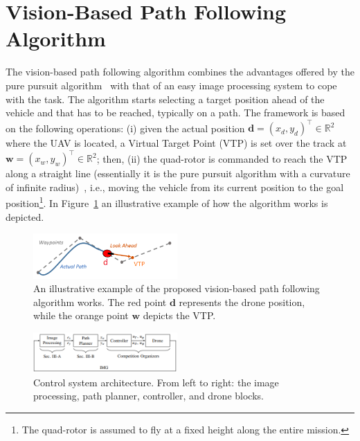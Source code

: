 \documentclass[a4paper,twocolumn,10pt]{article}
\begin{document}
    \section{Vision-Based Path Following Algorithm}
    \label{sec:purPursuitTrackingAlgorithm}

    The vision-based path following algorithm combines the advantages offered by the pure pursuit algorithm~\cite{14_coulter1992implementation} with that of an easy image processing system to cope with the task. The algorithm starts selecting a target position ahead of the vehicle and that has to be reached, typically on a path. The framework is based on the following operations: (i) given 
    the actual position $\mathbf{d}=(x_d, y_d)^\top \in \mathbb{R}^2$ where the UAV is located, 
    a Virtual Target Point (VTP)  is set over the track at $\mathbf{w}=(x_w, y_w)^\top \in \mathbb{R}^2$; then, (ii) the quad-rotor is commanded to reach the VTP along a straight line (essentially it is the pure 
    pursuit algorithm with a curvature of infinite radius)~\cite{14_coulter1992implementation}, i.e., 
    moving the vehicle from its current position to the goal position\footnote{The quad-rotor is assumed to fly at a fixed height along the entire mission.}. 
    In Figure~\ref{fig:fig3path} an illustrative example of how the algorithm works is depicted. 

    \begin{figure}
        \centering
        \includegraphics[width=0.49\textwidth]{pics/fig3_path.png}
        \caption{An illustrative example of the proposed vision-based path following algorithm works. 
        The red point $\mathbf{d}$ represents the drone position, while the orange point $\mathbf{w}$ 
        depicts the VTP.}
        \label{fig:fig3path}
    \end{figure}
    \begin{figure}
        \centering
        \includegraphics[width=0.49\textwidth]{pics/fig4_frick.png}
        \caption{Control system architecture. From left to right: the image processing, path planner, 
        controller, and drone blocks.}
        \label{fig:fig4diagram}
    \end{figure}
\end{document}
